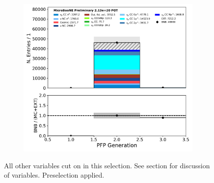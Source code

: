 \begin{figure}[H]
\begin{subfigure}[b]{0.3\textwidth}
        \end{subfigure}
        \begin{subfigure}[b]{0.3\textwidth}
        \centering
        \includegraphics[width=\textwidth]{NuMuCCsel/Images/Ryan/appendix_muonsel_input_R3/pfp_generation_v_07232020_presel_samples_detsys_event_category.pdf}
        \end{subfigure}
    \caption{All other variables cut on in this selection. See section for discussion of variables. Preselection applied.}
    \label{fig::Appendix::constraint:inputvars:others}
\end{figure}

